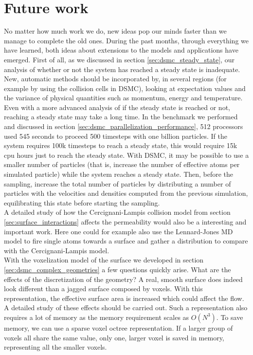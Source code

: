\section{Future work}
No matter how much work we do, new ideas pop our minds faster than we manage to complete the old ones. During the past months, through everything we have learned, both ideas about extensions to the models and applications have emerged. First of all, as we discussed in section \ref{sec:dsmc_steady_state}, our analysis of whether or not the system has reached a steady state is inadequate. New, automatic methods should be incorporated by, in several regions (for example by using the collision cells in DSMC), looking at expectation values and the variance of physical quantities such as momentum, energy and temperature. Even with a more advanced analysis of if the steady state is reached or not, reaching a steady state may take a long time. In the benchmark we performed and discussed in section \ref{sec:dsmc_parallelization_performance}, 512 processors used 545 seconds to proceed 500 timesteps with one billion particles. If the system requires 100k timesteps to reach a steady state, this would require 15k cpu hours just to reach the steady state. With DSMC, it may be possible to use a smaller number of particles (that is, increase the number of effective atoms per simulated particle) while the system reaches a steady state. Then, before the sampling, increase the total number of particles by distributing a number of particles with the velocities and densities computed from the previous simulation, equilibrating this state before starting the sampling.\\
A detailed study of how the Cercignani-Lampis collision model from section \ref{sec:surface_interactions} affects the permeability would also be a interesting and important work. Here one could for example also use the Lennard-Jones MD model to fire single atoms towards a surface and gather a distribution to compare with the Cercignani-Lampis model.\\
With the voxelization model of the surface we developed in section \ref{sec:dsmc_complex_geometries} a few questions quickly arise. What are the effects of the discretization of the geometry? A real, smooth surface does indeed look different than a jagged surface composed by voxels. With this representation, the effective surface area is increased which could affect the flow. A detailed study of these effects should be carried out. Such a representation also requires a lot of memory as the memory requirement scales as $O(N^3)$. To save memory, we can use a sparse voxel octree representation. If a larger group of voxels all share the same value, only one, larger voxel is saved in memory, representing all the smaller voxels.\\
